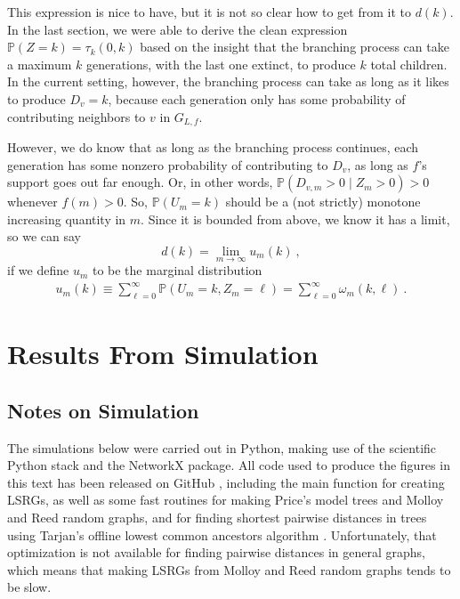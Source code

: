 \documentclass[12pt]{article}
\renewcommand{\P}{\mathbb{P}}
\begin{document}
This expression is nice to have, but it is not so clear how to get from it to $d(k)$.
In the last section, we were able to derive the clean expression $\P(Z=k)=\tau_k(0,k)$
based on the insight that the branching process can take a maximum $k$ generations, with the
last one extinct, to produce $k$ total children. In the current setting, however, the branching
process can take as long as it likes to produce $D_{v}=k$, because each generation only
has some probability of contributing neighbors to $v$ in $G_{L,f}$.\par

However, we do know that as long as the branching process continues, each generation has some
nonzero probability of contributing to $D_{v}$, as long as $f$'s support goes out far enough.
Or, in other words, $\P(D_{v,m} > 0 \mid Z_m > 0) > 0$ whenever $f(m) > 0$. So, $\P(U_m=k)$
should be a (not strictly) monotone increasing quantity in $m$. Since it is bounded from above,
we know it has a limit, so we can say \[ d(k) = \lim_{m\to\infty} u_m(k)\ ,\] if we define
$u_m$ to be the marginal distribution
\begin{align*}
u_m(k)\equiv\sum_{\ell=0}^\infty \P(U_m=k, Z_m=\ell) = \sum_{\ell=0}^\infty \omega_m(k, \ell)\ .
\end{align*}


\section{\textbf{\textsf{Results From Simulation}}}

\subsection{\textbf{\textsf{Notes on Simulation}}}

The simulations below were carried out in Python, making use of the scientific Python stack \cite{scipy} and
the NetworkX \cite{networkx} package. All code used to produce the figures in this text has been
released on GitHub \cite{thesourcecode}, including the main function for creating LSRGs, as well as some fast routines
for making Price's model trees and Molloy and Reed random graphs, and for finding shortest pairwise
distances in trees using Tarjan's offline lowest common ancestors algorithm \cite{tarjan1, tarjan2}.
Unfortunately, that optimization is not available for finding pairwise distances in general graphs,
which means that making LSRGs from Molloy and Reed random graphs tends to be slow.\par
\end{document}
